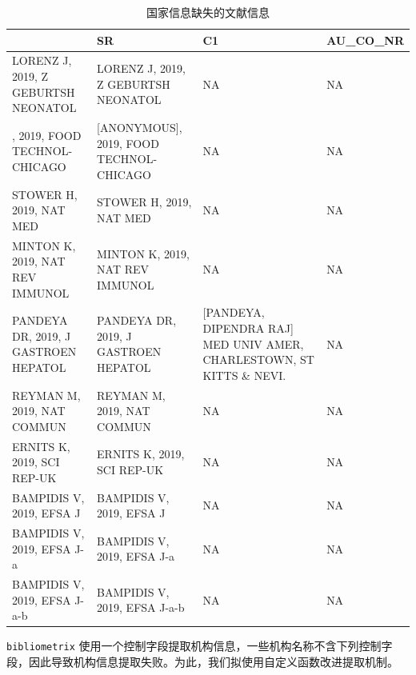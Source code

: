 \documentclass[]{ctexbook}
\begin{document}
\begin{table}

\caption{\label{tab:AU-CO-NA}国家信息缺失的文献信息}
\centering
\begin{tabular}[t]{l|l|l|l}
\hline
  & SR & C1 & AU\_CO\_NR\\
\hline
LORENZ J, 2019, Z GEBURTSH NEONATOL & LORENZ J, 2019, Z GEBURTSH NEONATOL & NA & NA\\
\hline
[ANONYMOUS], 2019, FOOD TECHNOL-CHICAGO & [ANONYMOUS], 2019, FOOD TECHNOL-CHICAGO & NA & NA\\
\hline
STOWER H, 2019, NAT MED & STOWER H, 2019, NAT MED & NA & NA\\
\hline
MINTON K, 2019, NAT REV IMMUNOL & MINTON K, 2019, NAT REV IMMUNOL & NA & NA\\
\hline
PANDEYA DR, 2019, J GASTROEN HEPATOL & PANDEYA DR, 2019, J GASTROEN HEPATOL & [PANDEYA, DIPENDRA RAJ] MED UNIV AMER, CHARLESTOWN, ST KITTS \& NEVI. & NA\\
\hline
REYMAN M, 2019, NAT COMMUN & REYMAN M, 2019, NAT COMMUN & NA & NA\\
\hline
ERNITS K, 2019, SCI REP-UK & ERNITS K, 2019, SCI REP-UK & NA & NA\\
\hline
BAMPIDIS V, 2019, EFSA J & BAMPIDIS V, 2019, EFSA J & NA & NA\\
\hline
BAMPIDIS V, 2019, EFSA J-a & BAMPIDIS V, 2019, EFSA J-a & NA & NA\\
\hline
BAMPIDIS V, 2019, EFSA J-a-b & BAMPIDIS V, 2019, EFSA J-a-b & NA & NA\\
\hline
\end{tabular}
\end{table}

\texttt{bibliometrix} 使用一个控制字段提取机构信息，一些机构名称不含下列控制字段，因此导致机构信息提取失败。为此，我们拟使用自定义函数改进提取机制。
\end{document}

